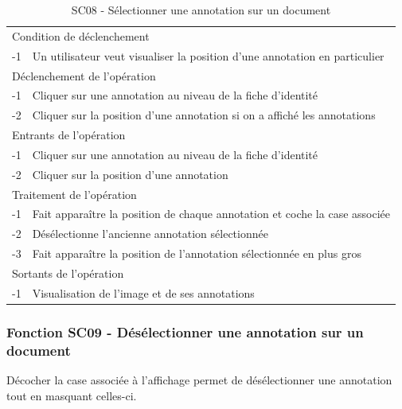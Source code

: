 \documentclass[a4paper]{article}
\begin{document}
\begin{table}[H]
  \centering
   \small
	\begin{tabular}{|c|p{12cm}|}
   		\hline
   			\rowcolor{lightgray}\multicolumn{2}{|c|}{\textbf{SC08 - Sélectionner une annotation sur un document}} \\
   		\hline
   			\multicolumn{2}{|l|}{Condition de d\'eclenchement} \\
   		\hline
   			-1 & Un utilisateur veut visualiser la position d’une annotation en particulier\\
   		\hline
   			\multicolumn{2}{|l|}{D\'eclenchement de l'op\'eration} \\
   		\hline
   			-1 & Cliquer sur une annotation au niveau de la fiche d’identité\\
            -2 & Cliquer sur la position d'une annotation si on a affiché les annotations\\
   		\hline
   			\multicolumn{2}{|l|}{Entrants de l'op\'eration} \\
   		\hline
   			-1 & Cliquer sur une annotation au niveau de la fiche d’identité\\
            -2 & Cliquer sur la position d'une annotation\\
   		\hline
   			\multicolumn{2}{|l|}{Traitement de l'op\'eration} \\
  		\hline
   			-1 & Fait apparaître la position de chaque annotation et coche la case associée\\
			-2 & Désélectionne l’ancienne annotation sélectionnée\\
			-3 & Fait apparaître la position de l’annotation sélectionnée en plus gros\\
   		\hline
   			\multicolumn{2}{|l|}{Sortants de l'op\'eration} \\
   		\hline
   			-1 & Visualisation de l’image et de ses annotations\\
   		\hline
	\end{tabular}
  \caption{SC08 - Sélectionner une annotation sur un document}
  \normalsize
  \label{tab:selectionner_annotation}
\end{table}

\subsubsection{Fonction SC09 - Désélectionner une annotation sur un document}
Décocher la case associée à l’affichage permet de désélectionner une annotation tout en masquant celles-ci.\\
\end{document}
